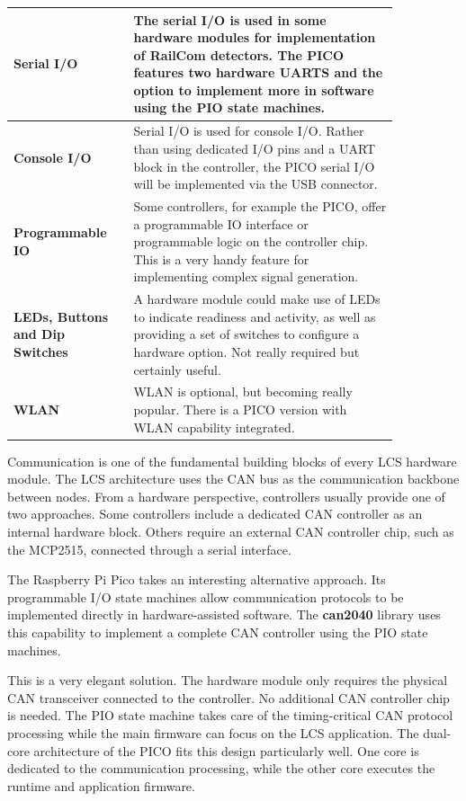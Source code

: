 \begin{longtable}{@{}p{0.25\linewidth}p{0.6\linewidth}@{}}
    \midrule
    \textbf{Serial I/O} & The serial I/O is used in some hardware modules for implementation of RailCom detectors. The PICO features two hardware UARTS and the option to implement more in software using the PIO state machines. \\
    \midrule
    \textbf{Console I/O} & Serial I/O is used for console I/O. Rather than using dedicated I/O pins and a UART block in the controller, the PICO serial I/O will be implemented via the USB connector. \\
    \midrule
    \textbf{Programmable IO} & Some controllers, for example the PICO, offer a programmable IO interface or programmable logic on the controller chip. This is a very handy feature for implementing complex signal generation. \\
    \midrule
    \textbf{LEDs, Buttons and Dip Switches} & A hardware module could make use of LEDs to indicate readiness and activity, as well as providing a set of switches to configure a hardware option. Not really required but certainly useful. \\
    \midrule
    \textbf{WLAN} & WLAN is optional, but becoming really popular. There is a PICO version with WLAN capability integrated. \\
\end{longtable}


Communication is one of the fundamental building blocks of every LCS hardware module. 
The LCS architecture uses the CAN bus as the communication backbone between nodes.
From a hardware perspective, controllers usually provide one of two approaches. Some controllers 
include a dedicated CAN controller as an internal hardware block. Others require an external CAN 
controller chip, such as the MCP2515, connected through a serial interface.

The Raspberry Pi Pico takes an interesting alternative approach. Its programmable I/O state machines 
allow communication protocols to be implemented directly in hardware-assisted software. The 
\textbf{can2040} library uses this capability to implement a complete CAN controller using the PIO 
state machines.

This is a very elegant solution. The hardware module only requires the physical CAN transceiver 
connected to the controller. No additional CAN controller chip is needed. The PIO state machine takes 
care of the timing-critical CAN protocol processing while the main firmware can focus on the LCS 
application.
The dual-core architecture of the PICO fits this design particularly well. One core is dedicated to 
the communication processing, while the other core executes the runtime and application firmware.


